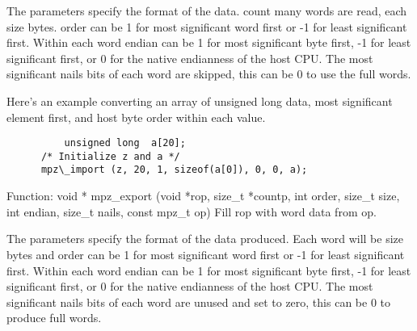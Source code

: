 The parameters specify the format of the data. count many words are read, each
size bytes. order can be 1 for most significant word first or -1 for least
significant first. Within each word endian can be 1 for most significant byte
first, -1 for least significant first, or 0 for the native endianness of the
host CPU. The most significant nails bits of each word are skipped, this can be
0 to use the full words.

Here's an example converting an array of unsigned long data, most significant
element first, and host byte order within each value.
\begin{lstlisting}
          unsigned long  a[20];
      /* Initialize z and a */
      mpz\_import (z, 20, 1, sizeof(a[0]), 0, 0, a);
\end{lstlisting}      

 Function: void * mpz\_export (void *rop, size\_t *countp, int order, size\_t size, int endian, size\_t nails, const mpz\_t op)
Fill rop with word data from op.

The parameters specify the format of the data produced. Each word will be size
bytes and order can be 1 for most significant word first or -1 for least
significant first. Within each word endian can be 1 for most significant byte
first, -1 for least significant first, or 0 for the native endianness of the
host CPU. The most significant nails bits of each word are unused and set to
zero, this can be 0 to produce full words. 
